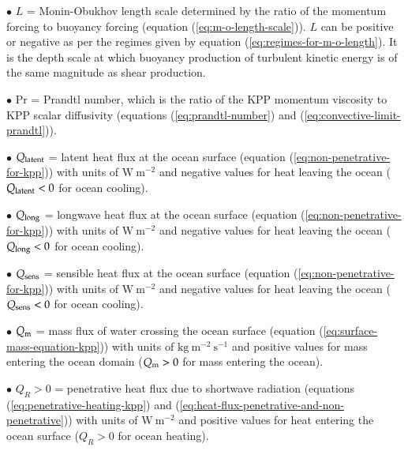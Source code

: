 \begin{trivlist}
\item[$\bullet$] $L$ = Monin-Obukhov length scale determined by the
  ratio of the momentum forcing to buoyancy forcing (equation
  (\ref{eq:m-o-length-scale})).  $L$ can be positive or negative as
  per the regimes given by equation (\ref{eq:regimes-for-m-o-length}).
  It is the depth scale at which buoyancy production of turbulent
  kinetic energy is of the same magnitude as shear production.

\item[$\bullet$] $\mbox{Pr}$ = Prandtl number, which is the ratio of
  the KPP momentum viscosity to KPP scalar diffusivity (equations
  (\ref{eq:prandtl-number}) and (\ref{eq:convective-limit-prandtl})).

\item[$\bullet$] $Q_{\mbox{\scriptsize latent}}$ = latent heat flux at
  the ocean surface (equation (\ref{eq:non-penetrative-for-kpp})) with
  units of $\mbox{W}~\mbox{m}^{-2}$ and negative values for heat
  leaving the ocean ($Q_{\mbox{\scriptsize latent}} < 0$ for ocean
  cooling).

\item[$\bullet$] $Q_{\mbox{\scriptsize long}}$ = longwave heat flux at
  the ocean surface (equation (\ref{eq:non-penetrative-for-kpp})) with
  units of $\mbox{W}~\mbox{m}^{-2}$ and negative values for heat
  leaving the ocean ($Q_{\mbox{\scriptsize long}} < 0$ for ocean
  cooling).

\item[$\bullet$] $Q_{\mbox{\scriptsize sens}}$ = sensible heat flux at
  the ocean surface (equation (\ref{eq:non-penetrative-for-kpp})) with
  units of $\mbox{W}~\mbox{m}^{-2}$ and negative values for heat
  leaving the ocean ($Q_{\mbox{\scriptsize sens}} < 0$ for ocean
  cooling).

\item[$\bullet$] $Q_{\mbox{\scriptsize m}}$ = mass flux of water crossing the ocean surface
  (equation (\ref{eq:surface-mass-equation-kpp})) with units of
  $\mbox{kg}~\mbox{m}^{-2}~\mbox{s}^{-1}$ and positive values for mass
  entering the ocean domain ($Q_{\mbox{\scriptsize m}} > 0$ for mass entering the ocean).

\item[$\bullet$] $Q_{R} > 0$ = penetrative heat flux due to shortwave
  radiation (equations (\ref{eq:penetrative-heating-kpp}) and
  (\ref{eq:heat-flux-penetrative-and-non-penetrative})) with units of
  $\mbox{W}~\mbox{m}^{-2}$ and positive values for heat entering the
  ocean surface ($Q_{R} > 0$ for ocean heating).


\end{trivlist}
